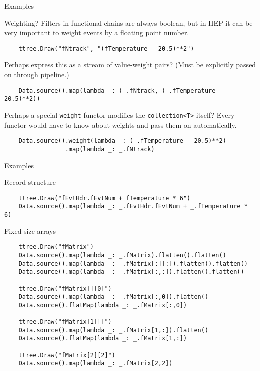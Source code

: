 \documentclass{beamer}
\begin{document}
\begin{frame}[fragile]{Examples}
\begin{block}{Weighting?}
Filters in functional chains are always boolean, but in HEP it can be very important to weight events by a floating point number.

{\scriptsize \begin{verbatim}
    ttree.Draw("fNtrack", "(fTemperature - 20.5)**2")
\end{verbatim}}

Perhaps express this as a stream of value-weight pairs? (Must be explicitly passed on through pipeline.)

{\scriptsize \begin{verbatim}
    Data.source().map(lambda _: (_.fNtrack, (_.fTemperature - 20.5)**2))
\end{verbatim}}

Perhaps a special {\tt weight} functor modifies the {\tt collection<T>} itself? Every functor would have to know about weights and pass them on automatically.

{\scriptsize \begin{verbatim}
    Data.source().weight(lambda _: (_.fTemperature - 20.5)**2)
                 .map(lambda _: _.fNtrack)
\end{verbatim}}
\end{block}
\end{frame}

\begin{frame}[fragile]{Examples}
\begin{block}{Record structure}
\vspace{-0.5\baselineskip}
{\scriptsize \begin{verbatim}
    ttree.Draw("fEvtHdr.fEvtNum + fTemperature * 6")
    Data.source().map(lambda _: _.fEvtHdr.fEvtNum + _.fTemperature * 6)
\end{verbatim}}
\vspace{-0.5\baselineskip}
\end{block}

\begin{block}{Fixed-size arrays}
\vspace{-0.5\baselineskip}
{\scriptsize \begin{verbatim}
    ttree.Draw("fMatrix")
    Data.source().map(lambda _: _.fMatrix).flatten().flatten()
    Data.source().map(lambda _: _.fMatrix[:][:]).flatten().flatten()
    Data.source().map(lambda _: _.fMatrix[:,:]).flatten().flatten()

    ttree.Draw("fMatrix[][0]")
    Data.source().map(lambda _: _.fMatrix[:,0]).flatten()
    Data.source().flatMap(lambda _: _.fMatrix[:,0])

    ttree.Draw("fMatrix[1][]")
    Data.source().map(lambda _: _.fMatrix[1,:]).flatten()
    Data.source().flatMap(lambda _: _.fMatrix[1,:])

    ttree.Draw("fMatrix[2][2]")
    Data.source().map(lambda _: _.fMatrix[2,2])
\end{verbatim}}
\vspace{-0.5\baselineskip}
\end{block}
\end{frame}
\end{document}
